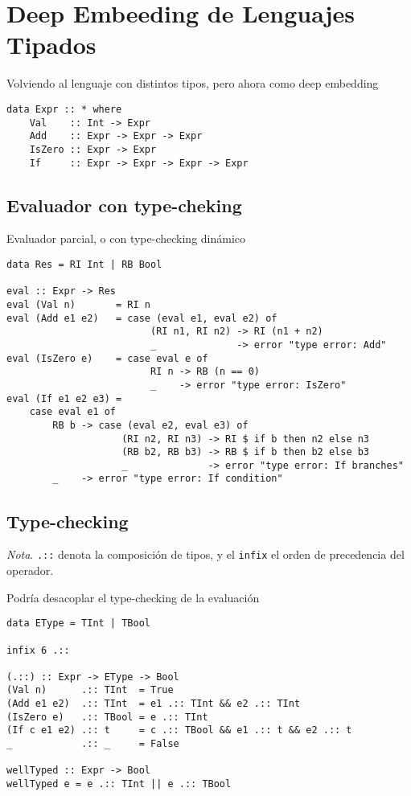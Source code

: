 \documentclass{article}
\newcommand{\imp}[1]{\textcolor{color1}{#1}}
\begin{document}
\section{Deep Embeeding de Lenguajes Tipados}

\noindent Volviendo al lenguaje con distintos \imp{tipos}, pero ahora como \imp{deep embedding}

\begin{lstlisting}
data Expr :: * where
    Val    :: Int -> Expr
    Add    :: Expr -> Expr -> Expr
    IsZero :: Expr -> Expr
    If     :: Expr -> Expr -> Expr -> Expr
\end{lstlisting}

\subsection{Evaluador con type-cheking}

Evaluador \imp{parcial}, o con type-checking dinámico
\begin{lstlisting}
data Res = RI Int | RB Bool

eval :: Expr -> Res
eval (Val n)       = RI n
eval (Add e1 e2)   = case (eval e1, eval e2) of
                         (RI n1, RI n2) -> RI (n1 + n2)
                         _              -> error "type error: Add"
eval (IsZero e)    = case eval e of
                         RI n -> RB (n == 0)
                         _    -> error "type error: IsZero"
eval (If e1 e2 e3) = 
    case eval e1 of
        RB b -> case (eval e2, eval e3) of
                    (RI n2, RI n3) -> RI $ if b then n2 else n3
                    (RB b2, RB b3) -> RB $ if b then b2 else b3
                    _              -> error "type error: If branches"
        _    -> error "type error: If condition"
\end{lstlisting}

\newpage

\subsection{Type-checking}

\imp{\emph{Nota}}. \texttt{.::} denota la composición de tipos, y el \texttt{infix} el orden de precedencia del operador.

Podría \imp{desacoplar} el type-checking de la evaluación
\begin{lstlisting}
data EType = TInt | TBool

infix 6 .::

(.::) :: Expr -> EType -> Bool
(Val n)      .:: TInt  = True
(Add e1 e2)  .:: TInt  = e1 .:: TInt && e2 .:: TInt
(IsZero e)   .:: TBool = e .:: TInt
(If c e1 e2) .:: t     = c .:: TBool && e1 .:: t && e2 .:: t
_            .:: _     = False

wellTyped :: Expr -> Bool
wellTyped e = e .:: TInt || e .:: TBool
\end{lstlisting}
\end{document}
